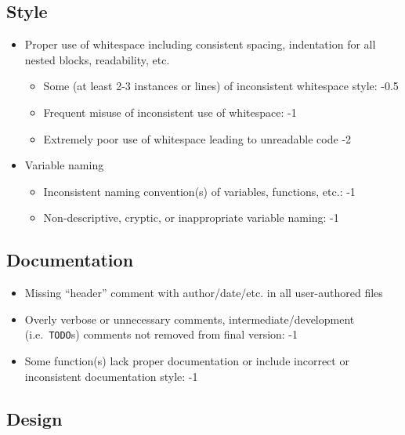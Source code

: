 \documentclass[12pt]{scrartcl}
\begin{document}
\subsection*{Style}

\begin{itemize}
  \item Proper use of whitespace including consistent spacing, indentation for all nested blocks, readability, etc.
  \begin{itemize}
    \item Some (at least 2-3 instances or lines) of inconsistent whitespace style: -0.5
    \item Frequent misuse of inconsistent use of whitespace: -1 
    \item Extremely poor use of whitespace leading to unreadable code -2
  \end{itemize}
  \item Variable naming
  \begin{itemize}
    \item Inconsistent naming convention(s) of variables, functions, etc.: -1
    \item Non-descriptive, cryptic, or inappropriate variable naming: -1
  \end{itemize}
\end{itemize}

\subsection*{Documentation}

\begin{itemize}
  \item Missing ``header'' comment with author/date/etc. in all user-authored files
  \item Overly verbose or unnecessary comments, intermediate/development (i.e.\ \texttt{TODO}s) comments not removed from final version: -1
  \item Some function(s) lack proper documentation or include incorrect or inconsistent documentation style: -1
\end{itemize}

\subsection*{Design}
\end{document}

